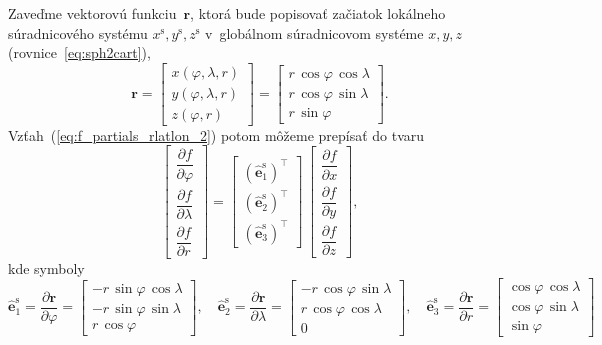 \documentclass[a4paper, 12pt]{book}
\let\vec\mathbf
\begin{document}
Zaveďme vektorovú funkciu~$\vec r$, ktorá bude popisovať začiatok lokálneho 
súradnicového systému $x^\mathrm{s}, y^\mathrm{s}, z^\mathrm{s}$ v~globálnom 
súradnicovom systéme $x, y, z$ (rovnice~\ref{eq:sph2cart}),
%
\begin{equation}
\label{eq:vector_r}
\vec r =
%
\begin{bmatrix}
x(\varphi, \lambda, r)\\
y(\varphi, \lambda, r)\\
z(\varphi, r)
\end{bmatrix}
%
=
%
\begin{bmatrix}
r \, \cos\varphi \, \cos\lambda\\
r \, \cos\varphi \, \sin\lambda\\
r \, \sin\varphi
\end{bmatrix}
%
{.}
\end{equation}
%
Vzťah~(\ref{eq:f_partials_rlatlon_2}) potom môžeme prepísať do tvaru
%
\begin{equation}
\label{eq:grad_cart2sph}
\begin{bmatrix}
\dfrac{\partial f}{\partial \varphi}\\[2ex]
\dfrac{\partial f}{\partial \lambda}\\[2ex]
\dfrac{\partial f}{\partial r}
\end{bmatrix}
%
=
%
\begin{bmatrix}
\left( \hat{\vec e}_1^\mathrm{s} \right)^\top\\
\left( \hat{\vec e}_2^\mathrm{s} \right)^\top\\
\left( \hat{\vec e}_3^\mathrm{s} \right)^\top
\end{bmatrix}
%
\,
%
\begin{bmatrix}
\dfrac{\partial f}{\partial x}\\[2ex]
\dfrac{\partial f}{\partial y}\\[2ex]
\dfrac{\partial f}{\partial z}
\end{bmatrix}
%
{,}
\end{equation}
%
kde symboly
%
\begin{equation}
\label{eq:er_elat_elon}
\hat{\vec e}_1^\mathrm{s} = \frac{\partial \vec r}{\partial \varphi} = 
%
\begin{bmatrix}
-r \, \sin\varphi \, \cos\lambda\\
-r \, \sin\varphi \, \sin\lambda\\
r \, \cos\varphi
\end{bmatrix}
%
{,}\quad
%
\hat{\vec e}_2^\mathrm{s} = \frac{\partial \vec r}{\partial \lambda} = 
%
\begin{bmatrix}
-r \, \cos\varphi \, \sin\lambda\\
r \, \cos\varphi \, \cos\lambda\\
0
\end{bmatrix}
%
{,}\quad
%
\hat{\vec e}_3^\mathrm{s} = \frac{\partial \vec r}{\partial r} = 
%
\begin{bmatrix}
\cos\varphi \, \cos\lambda\\
\cos\varphi \, \sin\lambda\\
\sin\varphi
\end{bmatrix}
%
\end{equation}
\end{document}
